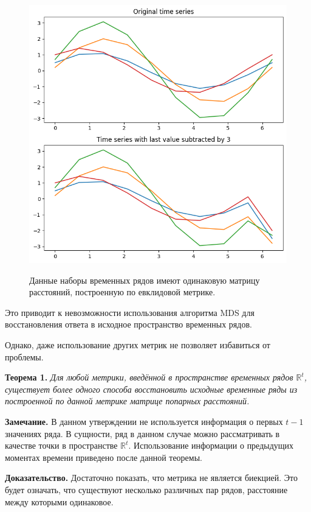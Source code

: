\documentclass{article}
\begin{document}
\begin{figure}[H]
	\centering
	\includegraphics[width=\textwidth]{SameMatrix.png}
	\label{fig:fig1}
	\caption{Данные наборы временных рядов имеют одинаковую матрицу расстояний, построенную по евклидовой метрике.}
\end{figure}

Это приводит к невозможности использования алгоритма MDS для восстановления ответа в исходное пространство временных рядов.

Однако, даже использование других метрик не позволяет избавиться от проблемы.

\textbf{Теорема 1.} \textit{Для любой метрики, введённой в пространстве временных рядов $\mathbb{R}^t$, существует более одного способа восстановить исходные временные ряды из построенной по данной метрике матрице попарных расстояний.}

\textbf{Замечание.} В данном утверждении не используется информация о первых $t-1$ значениях ряда. В сущности, ряд в данном случае можно рассматривать в качестве точки в пространстве $\mathbb{R}^t$. Использование информации о предыдущих моментах времени приведено после данной теоремы.

\textbf{Доказательство.} Достаточно показать, что метрика не является биекцией. Это будет означать, что существуют несколько различных пар рядов, расстояние между которыми одинаковое.
\end{document}
